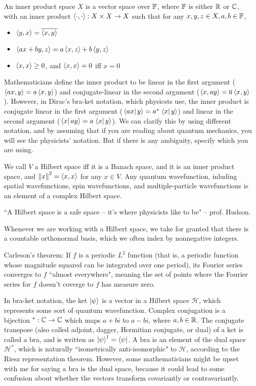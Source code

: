 \documentclass{article}
\begin{document}
\par
An inner product space $X$ is a vector space over $\mathbb{F}$, where $\mathbb{F}$ is either $\mathbb{R}$ or $\mathbb{C}$, with an inner product $\left\langle \cdot, \cdot \right\rangle: X \times X \rightarrow X$ such that for any $x,y,z \in X, a,b \in \mathbb{F}$,
\begin{itemize}[noitemsep]
    \item $\left\langle y,x \right\rangle = \overline{\left\langle x, y \right\rangle}$
    \item $\left\langle ax+by, z \right\rangle = a \left\langle x,z \right\rangle+b\left\langle y,z \right\rangle$
    \item $\left\langle x, x \right\rangle \geq 0$, and $\left\langle x,x \right\rangle=0$ iff $x=0$
\end{itemize}
\begin{note}
    Mathematicians define the inner product to be linear in the first argument ($\left\langle ax,y \right\rangle=a\left\langle x,y \right\rangle$) and conjugate-linear in the second argument ($\left\langle x,ay \right\rangle=\overline{a}\left\langle x,y \right\rangle$). However, in Dirac's bra-ket notation, which physicsts use, the inner product is conjugate linear in the first argument ($ \left.\left\langle ax\right\vert y \right\rangle = a^* \left.\left\langle x\right\vert y \right\rangle$) and linear in the second argument ($ \left.\left\langle x\right\vert ay \right\rangle =a \left.\left\langle x\right\vert y \right\rangle$). We can clarify this by using different notation, and by assuming that if you are reading about quantum mechanics, you will see the physicists' notation. But if there is any ambiguity, specify which you are using.
\end{note}
\par
We call $V$ a Hilbert space iff it is a Banach space, and it is an inner product space, and $\left\lVert x\right\rVert^2=\left\langle x,x \right\rangle$ for any $x \in V$. Any quantum wavefunction, inluding spatial wavefunctions, spin wavefunctions, and multiple-particle wavefunctions is an element of a complex Hilbert space.
\begin{thm}
    ``A Hilbert space is a safe space -- it's where physicists like to be" -- prof. Hudson.
\end{thm}
Whenever we are working with a Hilbert space, we take for granted that there is a countable orthonormal basis, which we often index by nonnegative integers.
\begin{thm}
    Carleson's theorem: If $f$ is a periodic $L^2$ function (that is, a periodic function whose magnitude squared can be integrated over one period), its Fourier series converges to $f$ ``almost everywhere", meaning the set of points where the Fourier series for $f$ doesn't coverge to $f$ has measure zero.
\end{thm}
In bra-ket notation, the ket $\left\lvert \psi \right\rangle$ is a vector in a Hilbert space $\mathcal{H}$, which represents some sort of quantum wavefunction. Complex conjugation is a bijection $^* : \mathbb{C} \rightarrow \mathbb{C}$ which maps $a+bi$ to $a-bi$, where $a,b \in \mathbb{R}$. The conjugate transpose (also called adjoint, dagger, Hermitian conjugate, or dual) of a ket is called a bra, and is written as $\left\lvert \psi \right\rangle^\dag=\left\langle \psi \right\rvert$. A bra is an element of the dual space $\mathcal{H}^*$, which is naturally ``isometrically anti-isomorphic" to $\mathcal{H}$, according to the Riesz representation theorem. However, some mathematicians might be upset with me for saying a bra is the dual space, because it could lead to some confusion about whether the vectors transform covariantly or contravariantly.
\end{document}
